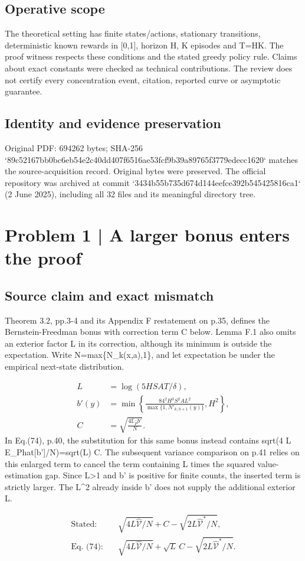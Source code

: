 \documentclass[10pt]{article}
\begin{document}
\subsection*{Operative scope}
The theoretical setting has finite states/actions, stationary transitions, deterministic known rewards in [0,1], horizon H, K episodes and T=HK. The proof witness respects these conditions and the stated greedy policy rule. Claims about exact constants were checked as technical contributions. The review does not certify every concentration event, citation, reported curve or asymptotic guarantee.\par
\subsection*{Identity and evidence preservation}
Original PDF: 694262 bytes; SHA-256 `89c52167bb0bc6eb54e2c40dd407f6516ae53fcf9b39a89765f3779edecc1620` matches the source-acquisition record. Original bytes were preserved. The official repository was archived at commit `3434b55b735d674d144eefce392b545425816ca1` (2 June 2025), including all 32 files and its meaningful directory tree.\par
\section*{Problem 1 | A larger bonus enters the proof}
\subsection*{Source claim and exact mismatch}
Theorem 3.2, pp.3-4 and its Appendix F restatement on p.35, defines the Bernstein-Freedman bonus with correction term C below. Lemma F.1 also omits an exterior factor L in its correction, although its minimum is outside the expectation. Write N=max\{N\_k(x,a),1\}, and let expectation be under the empirical next-state distribution.\par
\[\begin{aligned}L&=\log(5HSAT/\delta),\\ b'(y)&=\min\!\left\{\frac{84^2H^3S^2AL^2}{\max\{1,N'_{k,h+1}(y)\}},H^2\right\},\\ C&=\sqrt{\frac{4\mathbb E_{\widehat P}b'}{N}}.\end{aligned}\] In Eq.(74), p.40, the substitution for this same bonus instead contains sqrt(4 L E\_Phat[b’]/N)=sqrt(L) C. The subsequent variance comparison on p.41 relies on this enlarged term to cancel the term containing L times the squared value-estimation gap. Since L>1 and b’ is positive for finite counts, the inserted term is strictly larger. The L\textasciicircum{}2 already inside b’ does not supply the additional exterior L.\par
\[\begin{aligned}\text{Stated:}\quad &\sqrt{4L\widehat{\mathcal V}/N}+C-\sqrt{2L\widehat{\mathcal V}^{*}/N},\\ \text{Eq. (74):}\quad &\sqrt{4L\widehat{\mathcal V}/N}+\sqrt L\,C-\sqrt{2L\widehat{\mathcal V}^{*}/N}.\end{aligned}\]\par
\end{document}
